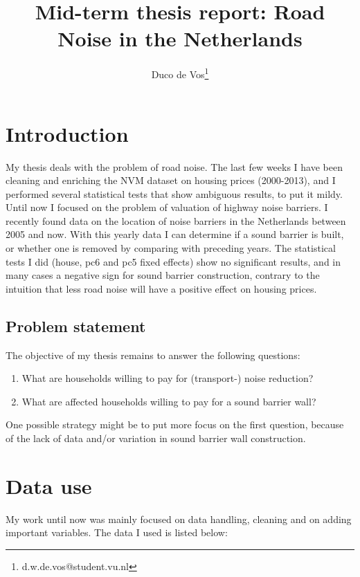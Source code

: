 \documentclass[]{scrartcl}
\title{Mid-term thesis report: Road Noise in the Netherlands}
\author{Duco de Vos\thanks{d.w.de.vos@student.vu.nl}}
\affil{Vrije Universiteit Amsterdam}
\begin{document}
\maketitle

\section{Introduction}
My thesis deals with the problem of road noise. The last few weeks I have been cleaning and enriching the NVM dataset on housing prices (2000-2013), and I performed several statistical tests that show ambiguous results, to put it mildy. Until now I focused on the problem of valuation of highway noise barriers. I recently found data on the location of noise barriers in the Netherlands between 2005 and now. With this yearly data I can determine if a sound barrier is built, or whether one is removed by comparing with preceding years. The statistical tests I did (house, pc6 and pc5 fixed effects) show no significant results, and in many cases a negative sign for sound barrier construction, contrary to the intuition that less road noise will have a positive effect on housing prices.

\subsection{Problem statement}
The objective of my thesis remains to answer the following questions:
\begin{enumerate}
	\item What are households willing to pay for (transport-) noise reduction?
	\item What are affected households willing to pay for a sound barrier wall?
\end{enumerate} 
One possible strategy might be to put more focus on the first question, because of the lack of data and/or variation in sound barrier wall construction. 

\section{Data use}
My work until now was mainly focused on data handling, cleaning and on adding important variables. The data I used is listed below:
\end{document}
